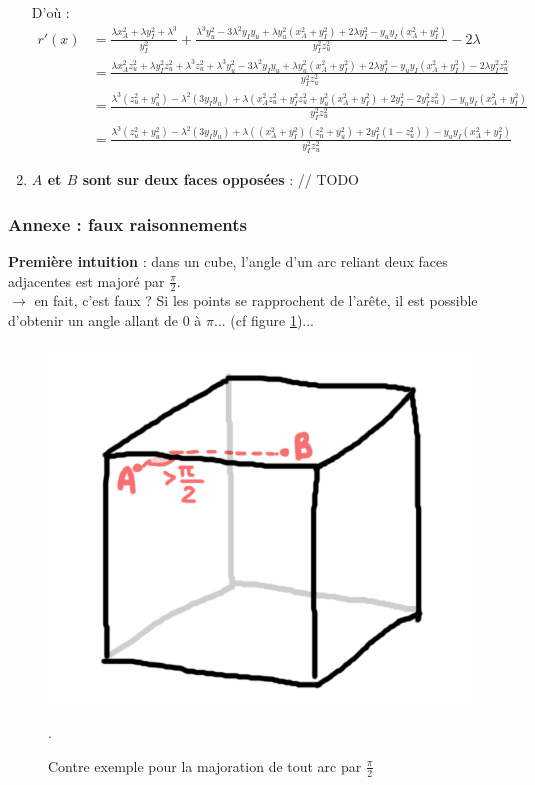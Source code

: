 \documentclass{article}
\begin{document}
\begin{enumerate}
    D'où :
    \begin{align*}
        r'(x) &= \frac{\lambda x_A^2 + \lambda y_I^2 + \lambda^3}{y_I^2} + \frac{\lambda^3y_u^2 - 3\lambda^2 y_Iy_u + \lambda y_u^2(x_A^2 + y_I^2) + 2\lambda y_I^2 - y_uy_I(x_A^2 + y_I^2)}{y_I^2z_u^2} - 2\lambda\\
        &= \frac{\lambda x_A^2z_u^2 + \lambda y_I^2z_u^2 + \lambda^3z_u^2 + \lambda^3y_u^2 - 3\lambda^2 y_Iy_u + \lambda y_u^2(x_A^2 + y_I^2) + 2\lambda y_I^2 - y_uy_I(x_A^2 + y_I^2) - 2\lambda y_I^2z_u^2}{y_I^2z_u^2}\\
        &=\frac{\lambda^3(z_u^2 + y_u^2) - \lambda^2(3y_Iy_u) + \lambda(x_A^2z_u^2 + y_I^2z_u^2 + y_u^2(x_A^2 + y_I^2) + 2y_I^2  - 2y_I^2z_u^2) - y_uy_I(x_A^2 + y_I^2)}{y_I^2z_u^2}\\
        &=\frac{\lambda^3(z_u^2 + y_u^2) - \lambda^2(3y_Iy_u) + \lambda((x_A^2 + y_I^2)(z_u^2 + y_u^2) + 2y_I^2(1-z_u^2)) - y_uy_I(x_A^2 + y_I^2)}{y_I^2z_u^2}
    \end{align*}
    \item\textbf{$A$ et $B$ sont sur deux faces opposées} : // TODO
\end{enumerate}


\subsubsection{Annexe : faux raisonnements}
\textbf{Première intuition} : dans un cube, l'angle d'un arc reliant deux faces adjacentes est majoré par $\frac{\pi}{2}$.\\
$\rightarrow$ en fait, c'est faux ? Si les points se rapprochent de l'arête, il est possible d'obtenir un angle allant de 0 à $\pi$... (cf figure \ref{fig:contre_ex_0})...

\begin{figure}[!h]
    \centering
    \includegraphics[width=0.3\linewidth]{contre_ex_0.png}
    \caption{Contre exemple pour la majoration de tout arc par $\frac{\pi}{2}$}.
    \label{fig:contre_ex_0}
\end{figure}
\end{document}
